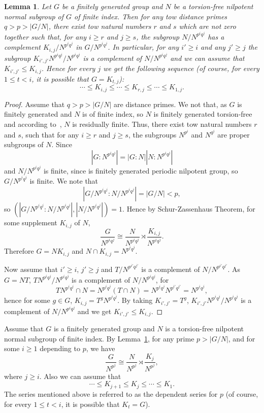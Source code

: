 \documentclass[11pt]{amsart}
\newtheorem{lemma}[theorem]{Lemma}
\newcommand{\sub}{\leqslant}
\begin{document}
\begin{lemma}\label{L-3.1}
Let $G$ be a finitely generated group  and $N$ be a torsion-free nilpotent normal subgroup of $G$ of finite index. Then for any tow distance primes $q>p>|G/N|$, there exist tow natural numbers $r$  and $s$ which are not zero together such that,  for any $i\geq r$ and $j\geq s$, the subgroup $N/N^{p^iq^j}$ has a complement $K_{i,j}/N^{p^iq^j}$ in $G/N^{p^iq^j}$. In particular, for any $i'\geq i$ and any $j'\geq j$ the subgroup $K_{i',j'}N^{p^iq^j}/N^{p^iq^j}$ is a complement of $N/N^{p^iq^j}$ and we can assume that $K_{i',j'}\sub K_{i,j}$. Hence for every $j$ we get the following sequence (of course, for every $1\leq t<i$, it is possible that $G = K_{t,j}$):
\[\cdots\sub K_{i,j}\sub\cdots\sub K_{r,j}\sub\cdots\sub K_{1,j}.\]
\end{lemma}
\begin{proof}
 Assume that $q>p>|G/N|$ are distance primes. We not that, as $G$ is finitely generated and $N$ is of finite index, so $N$ is finitely generated torsion-free and according to~\cite[5.2.21]{Rob}, $N$ is residually finite. Thus, there exist tow natural numbers $r$ and $s$, such that for any $i\geq r$ and $j\geq s$, the subgroups $N^{p^i}$ and $N^{q^j}$ are proper subgroups of  $N$.  Since
 \[|G:N^{p^iq^j}|=|G:N||N:N^{p^iq^j}|\] 
 and $N/N^{p^iq^j}$ is finite, since is finitely generated periodic nilpotent group, so $G/N^{p^iq^j}$ is finite. We note that  
 \[|G/N^{p^iq^j}: N/N^{p^iq^j}|=|G/N|<p,\] 
so 
$(|G/N^{p^iq^j}: N/N^{p^iq^j}|, |N/N^{p^iq^j}|)=1$. Hence by Schur-Zassenhaus Theorem, for some supplement $K_{i,j}$ of $N$,
 \[\frac{G}{N^{p^iq^j}}\cong \frac{N}{N^{p^iq^j}}\rtimes \frac{K_{i,j}}{N^{p^iq^j}}.\]
Therefore $G=NK_{i,j}$ and $N\cap K_{i,j}=N^{p^iq^j}$.

Now assume that $i'\geq i$, $j'\geq j$ and $T/N^{p^{i'}q^{j'}}$ is a complement of $N/N^{p^{i'}q^{j'}}$. As $G=NT$, $TN^{p^iq^j}/N^{p^iq^j}$ is a complement of $N/N^{p^iq^j}$, for
\[TN^{p^iq^j}\cap N=N^{p^iq^j}(T\cap N)=N^{p^iq^j}N^{p^{i'}q^{j'}}=N^{p^iq^j},\]
hence for some $g\in G$, $K_{i,j}=T^gN^{p^iq^j}$. By taking $K_{i',j'}=T^g$, $K_{i',j'}N^{p^iq^j}/N^{p^iq^j}$ is a complement of $N/N^{p^iq^j}$ and we get $K_{i',j'}\sub K_{i,j}$.
\end{proof}
Assume that $G$ is a finitely generated group and $N$ is a torsion-free nilpotent normal subgroup of finite index. 
By Lemma~\ref{L-3.1}, for any prime $p>|G/N|$, and for some $i\geq 1$ depending to $p$, we have \[\frac{G}{N^{p^j}}\cong \frac{N}{N^{p^j}}\rtimes \frac{K_j}{N^{p^j}},\]
where $j\geq i$. Also we can assume that  \[\cdots\sub K_{j+1}\sub K_j\sub\cdots\sub K_1.\] 
The series mentioned above is referred to as the dependent series for $p$ (of course, for every $1\leq t<i$, it is possible that $ K_t=G$).
\end{document}
